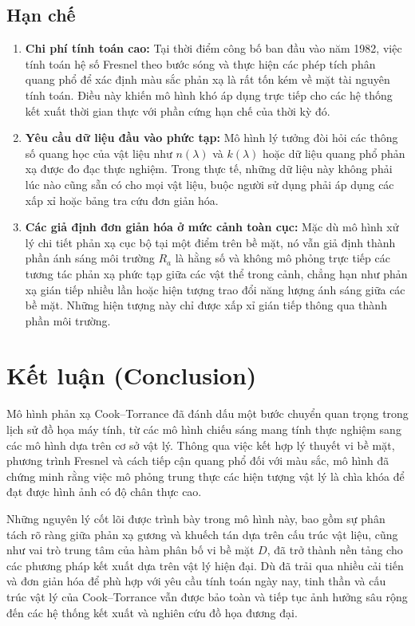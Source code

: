 \subsection{Hạn chế}
\begin{enumerate}
	\item \textbf{Chi phí tính toán cao:}  
	Tại thời điểm công bố ban đầu vào năm 1982, việc tính toán hệ số Fresnel theo bước sóng và thực hiện các phép tích phân quang phổ để xác định màu sắc phản xạ là rất tốn kém về mặt tài nguyên tính toán. Điều này khiến mô hình khó áp dụng trực tiếp cho các hệ thống kết xuất thời gian thực với phần cứng hạn chế của thời kỳ đó.
	
	\item \textbf{Yêu cầu dữ liệu đầu vào phức tạp:}  
	Mô hình lý tưởng đòi hỏi các thông số quang học của vật liệu như $n(\lambda)$ và $k(\lambda)$ hoặc dữ liệu quang phổ phản xạ được đo đạc thực nghiệm. Trong thực tế, những dữ liệu này không phải lúc nào cũng sẵn có cho mọi vật liệu, buộc người sử dụng phải áp dụng các xấp xỉ hoặc bảng tra cứu đơn giản hóa.
	
	\item \textbf{Các giả định đơn giản hóa ở mức cảnh toàn cục:}  
	Mặc dù mô hình xử lý chi tiết phản xạ cục bộ tại một điểm trên bề mặt, nó vẫn giả định thành phần ánh sáng môi trường $R_a$ là hằng số và không mô phỏng trực tiếp các tương tác phản xạ phức tạp giữa các vật thể trong cảnh, chẳng hạn như phản xạ gián tiếp nhiều lần hoặc hiện tượng trao đổi năng lượng ánh sáng giữa các bề mặt. Những hiện tượng này chỉ được xấp xỉ gián tiếp thông qua thành phần môi trường.
\end{enumerate}

\section{Kết luận (Conclusion)}

Mô hình phản xạ Cook--Torrance đã đánh dấu một bước chuyển quan trọng trong lịch sử đồ họa máy tính, từ các mô hình chiếu sáng mang tính thực nghiệm sang các mô hình dựa trên cơ sở vật lý. Thông qua việc kết hợp lý thuyết vi bề mặt, phương trình Fresnel và cách tiếp cận quang phổ đối với màu sắc, mô hình đã chứng minh rằng việc mô phỏng trung thực các hiện tượng vật lý là chìa khóa để đạt được hình ảnh có độ chân thực cao.

Những nguyên lý cốt lõi được trình bày trong mô hình này, bao gồm sự phân tách rõ ràng giữa phản xạ gương và khuếch tán dựa trên cấu trúc vật liệu, cũng như vai trò trung tâm của hàm phân bố vi bề mặt $D$, đã trở thành nền tảng cho các phương pháp kết xuất dựa trên vật lý hiện đại. Dù đã trải qua nhiều cải tiến và đơn giản hóa để phù hợp với yêu cầu tính toán ngày nay, tinh thần và cấu trúc vật lý của Cook--Torrance vẫn được bảo toàn và tiếp tục ảnh hưởng sâu rộng đến các hệ thống kết xuất và nghiên cứu đồ họa đương đại.